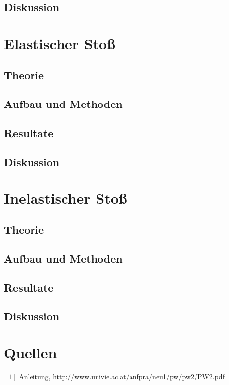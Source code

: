 \documentclass[12pt,a4paper]{article}
\begin{document}
\begin{multicols}{2}
\subsection{Diskussion}



\section{Elastischer Stoß}

\subsection{Theorie}

\subsection{Aufbau und Methoden}

\subsection{Resultate}

\subsection{Diskussion}



\section{Inelastischer Stoß}

\subsection{Theorie}

\subsection{Aufbau und Methoden}

\subsection{Resultate}

\subsection{Diskussion}


\section{Quellen}
$[1]$ Anleitung, \url{http://www.univie.ac.at/anfpra/neu1/pw/pw2/PW2.pdf}\\
\end{multicols}
\end{document}
